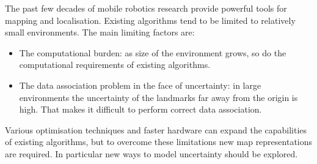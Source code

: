 The past few decades of mobile robotics research provide powerful
tools for mapping and localisation. Existing algorithms tend to be
limited to relatively small environments. The main limiting factors
are:

\begin{itemize}
\item The computational burden: as size of the environment grows, so do
  the computational requirements of existing algorithms.

\item The data association problem in the face of uncertainty: 
   in large environments the uncertainty of the landmarks far away
  from the origin is high. That makes it difficult to perform correct
  data association.

\end{itemize}

Various optimisation techniques and faster hardware can expand the
capabilities of existing algorithms, but to overcome these limitations
new map representations are required. In particular new ways to model
uncertainty should be explored.






\nocite{tim_bailey,
bosse03atlas,
fergusson2003,
thrun00,
dissanayake01,
SOG-Slam01,
guivant02:_simul,
guivant02:_solvin,
thrun02:_robot_mappin,
 zunino01:_simul,
 JensfeltKristensen01,
 JensfeltWijkAustin00a,
 JensfeltAustinWijk00b,
 anguelov02,
 hahnel02:_map,
 burgard99:_exper,
 schulz01:_track_multip_movin_objec_mobil_robot,
 castellanos99:_spmap,
 castellanos01:_multis,
 dudek00:_robus_place_recog_local_appear_method,
 konolige99:_increm_mappin_large_cyclic_envir,
 lu97:_global,
 gutmann96:_amos,
 williams:icra2002,
 williams:acra2001,
 Zimmer96,
 slam_kuiper91,
 slam_kuipers88,
 Thrun00j,
 Fox99,
 Cox91,
 Borenstein96,
 kk2002,
 sidenbladh00stochastic,
 Cox94,
 Thrun02h,
 Bennewitz02a,
 Liu01a,
 Dellaert00c,
 nieto2003, 
 konolige99,
 doucetraoblackwellised,
 guivant04,
 newman03,
 vandermerwe00_tr,
 vandermerwe2000,
 wan01unscented,
 unscented,
 Margaret_hybrid_maps,
 kuipers1978,
 KuipersLevitt88,
 Kuipers00,
 Buzan04,
 uhlmann97nondivergent,
 julier97new,
 julier96general,
 julier99scaled,
 doucet98sequential,
 DA_Lazy,
 Kuipers2004,
 kk2004}



